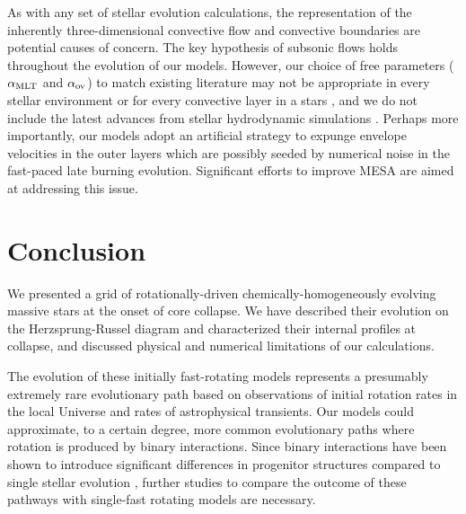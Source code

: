 \documentclass[%
trackchanges,twocolumn]{aastex701}
\begin{document}
As with any set of stellar evolution calculations, the representation
of the inherently three-dimensional convective flow
\cite[e.g.,][]{jermyn:22,joyce:23} and convective boundaries
\cite[e.g.,][]{davis:19, myers:26} are potential causes of concern.
The key hypothesis of subsonic flows holds throughout the evolution of
our models. However, our choice of free parameters ($\alpha_{\rm MLT}$
and $\alpha_{\rm ov}$) to match existing literature
\citep[e.g.,][]{brott:11, aguilera-dena:18, aguilera-dena:20} may not
be appropriate in every stellar environment
\citep[e.g.][]{joyce:18,chun:18} or for every convective layer in a
stars \citep[e.g.,][]{goldberg:22,ma:25,stuck:25,griffiths:26}, and we
do not include the latest advances from stellar hydrodynamic
simulations \citep[e.g.][]{yadav:20, schultz:20,anders:22, rizzuti:23,
  johnston:24}. Perhaps more importantly, our models adopt an
artificial strategy to expunge envelope velocities in the outer layers
which are possibly seeded by numerical noise in the fast-paced late
burning evolution. Significant efforts to improve \textsc{MESA} are
aimed at addressing this issue.


\section{Conclusion}\label{sec:conclusion}

We presented a grid of rotationally-driven chemically-homogeneously
evolving massive stars at the onset of core collapse. We have
described their evolution on the Herzsprung-Russel diagram and
characterized their internal profiles at collapse,
and discussed physical and numerical limitations of our calculations.

The evolution of these initially fast-rotating models represents a
presumably extremely rare evolutionary path based on observations of
initial rotation rates in the local Universe and rates of
astrophysical transients. Our models could approximate, to a certain
degree, more common evolutionary paths where rotation is produced by
binary interactions. Since binary interactions have been shown to
introduce significant differences in progenitor structures compared to
single stellar evolution \citep[e.g.,][]{laplace:21, vartanyan:21,
  farmer:23, laplace:25, maltsev:25, ma:25b}, further studies to
compare the outcome of these pathways with single-fast rotating models
are necessary.
\end{document}

